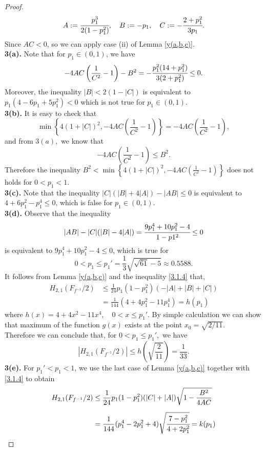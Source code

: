 \documentclass[a4paper,12pt]{amsart}
\theoremstyle{definition}
\numberwithin{equation}{section}
\begin{document}
\begin{proof}
$$
A:=\cfrac{p_1^3}{2(1-p_1^2)}, \quad B:=-p_1,\quad C:=-\cfrac{2+p_1^2}{3p_1}.
$$
Since $AC < 0$, so we can apply case (ii) of Lemma \ref{y(a,b,c)}.\\
[3mm]
\textbf{3(a).} Note that for $p_{1} \in(0,1)$, we have
$$
-4 A C\left(\frac{1}{C^{2}}-1\right)-B^{2}=-\cfrac{p_{1}^{2}(14+p_1^2)}{3(2+p_{1}^{2})} \leq  0.
$$
Moreover, the inequality $|B|<2(1-|C|)$ is equivalent to $p_1(4 - 6 p_1 + 5 p_1^2) < 0$ which is not true for $p_{1} \in(0,1)$.\\
[3mm]
\textbf{3(b).} It is easy to check that
$$
\min \left\{4(1+|C|)^{2},-4 A C\left(\frac{1}{C^{2}}-1\right)\right\}=-4 A C\left(\frac{1}{C^{2}}-1\right),
$$
and from $3(a),$ we know that 
$$
-4 A C\left(\frac{1}{C^{2}}-1\right) \leq B^{2}.
$$
Therefore the inequality $B^{2} < \min \left\{4(1+|C|)^{2},-4 A C\left(\frac{1}{C^{2}}-1\right)\right\}$ does not holds for $0<p_1<1$.\\[2mm]
\textbf{3(c).} Note that the inequality $|C|(|B|+4|A|)-|A B| \leq 0$ is equivalent to $4+6p_1^2
-p_1^4\leq 0$, which is false for $p_{1} \in(0,1)$.\\
[2mm]
\textbf{3(d).}
Observe that the inequality 
$$|A B|-|C|(|B|-4|A|)=\cfrac{9 p_1^4+10 p_1^2-4}{1 - p1^2} \leq 0
$$
is equivalent to $9 p_1^4+10 p_1^2-4\leq 0$, which is true for 
$$
0<p_1 \leq p_1'=\frac{1}{3}\sqrt{\sqrt{61}-5}\approx 0.5588.
$$
It follows from Lemma \ref{y(a,b,c)} and the inequality \eqref{3.1.4} that,
\begin{equation}
\begin{aligned}
H_{2,1}(F_{f^{-1}}/2)
&\leq \frac{1}{24}p_1(1-p_1^2)(-|A|+|B|+|C|)\\
&= \frac{1}{144}(4+4p_1^2-11p_1^4)=h(p_1)
\end{aligned}
\end{equation}
where $h(x)=4+4x^2-11x^4, \quad 0<x\leq p_1'$.
By simple calculation we can show that maximum of the function $g(x)$ exists at the point $x_0=\sqrt{2/11}$. \\
Therefore we can conclude that, for $0<p_1\leq p_1',$ we have
$$
|H_{2,1}(F_{f^{-1}}/2)|\leq h\left(\sqrt{\frac{2}{11}}\right)=\frac{1}{33}.
$$
\textbf{3(e).} For $p_1'<p_1<1$, we use the last case of Lemma \ref{y(a,b,c)} together with \eqref{3.1.4} to obtain
\begin{equation}
\begin{aligned}
H_{2,1}(F_{f^{-1}}/2)
&\leq \frac{1}{24}p_1(1-p_1^2)(|C|+|A|) \sqrt{1-\frac{B^{2}}{4 A C}}\\[2mm]
&= \frac{1}{144}(p_1^4-2p_1^2+4)\sqrt{\cfrac{7-p_1^2}{4+2p_1^2}}=k(p_1)

\end{aligned}
\end{equation}
\end{proof}
\end{document}

